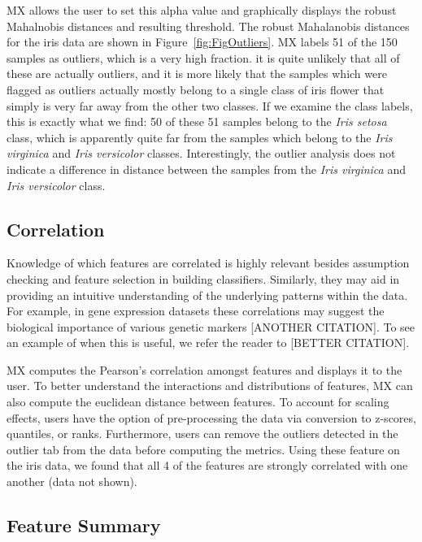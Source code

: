 \documentclass[12pt]{article}
\begin{document}
MX allows the user to set this alpha value and graphically displays the robust Mahalnobis distances and resulting threshold. The robust Mahalanobis distances for the iris data are shown in Figure~\ref{fig:FigOutliers}. MX labels 51 of the 150 samples as outliers, which is a very high fraction. it is quite unlikely that all of these are actually outliers, and it is more likely that the samples which were flagged as outliers actually mostly belong to a single class of iris flower that simply is very far away from the other two classes. If we examine the class labels, this is exactly what we find: 50 of these 51 samples belong to the \textit{Iris setosa} class, which is apparently quite far from the samples which belong to the \textit{Iris virginica} and \textit{Iris versicolor} classes. Interestingly, the outlier analysis does not indicate a difference in distance between the samples from the \textit{Iris virginica} and \textit{Iris versicolor} class. 

\subsection{Correlation}
\label{subsec:SubSecCorrelation}

Knowledge of which features are correlated is highly relevant besides assumption checking and feature selection in building classifiers. Similarly, they may aid in providing an intuitive understanding of the underlying patterns within the data. For example, in gene expression datasets these correlations may suggest the biological importance of various genetic markers [ANOTHER CITATION]. To see an example of when this is useful, we refer the reader to \cite{shi2012unsupervised} [BETTER CITATION].

MX computes the Pearson's correlation amongst features and displays it to the user. To better understand the interactions and distributions of features, MX can also compute the euclidean distance between features. To account for scaling effects, users have the option of pre-processing the data via conversion to z-scores, quantiles, or ranks. Furthermore, users can remove the outliers detected in the outlier tab from the data before computing the metrics. Using these feature on the iris data, we found that all 4 of the features are strongly correlated with one another (data not shown).

\subsection{Feature Summary}
\label{subsec:SubSecFeature}
\end{document}
